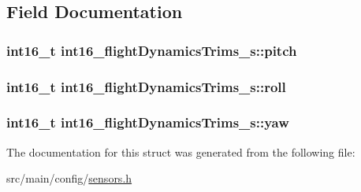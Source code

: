 \subsection{Field Documentation}
\hypertarget{structint16__flightDynamicsTrims__s_a3e8f2f4c583dcaa56197fea5d773362b}{
\subsubsection[{pitch}]{\setlength{\rightskip}{0pt plus 5cm}int16\+\_\+t int16\+\_\+flight\+Dynamics\+Trims\+\_\+s\+::pitch}}\label{structint16__flightDynamicsTrims__s_a3e8f2f4c583dcaa56197fea5d773362b}
\hypertarget{structint16__flightDynamicsTrims__s_ad9e62797feac16e45551ed4cab710dcc}{
\subsubsection[{roll}]{\setlength{\rightskip}{0pt plus 5cm}int16\+\_\+t int16\+\_\+flight\+Dynamics\+Trims\+\_\+s\+::roll}}\label{structint16__flightDynamicsTrims__s_ad9e62797feac16e45551ed4cab710dcc}
\hypertarget{structint16__flightDynamicsTrims__s_a28ee0803d216eddd967a888100e0df02}{
\subsubsection[{yaw}]{\setlength{\rightskip}{0pt plus 5cm}int16\+\_\+t int16\+\_\+flight\+Dynamics\+Trims\+\_\+s\+::yaw}}\label{structint16__flightDynamicsTrims__s_a28ee0803d216eddd967a888100e0df02}


The documentation for this struct was generated from the following file\+:\begin{DoxyCompactItemize}
\item 
src/main/config/\hyperlink{sensors_8h}{sensors.\+h}\end{DoxyCompactItemize}
